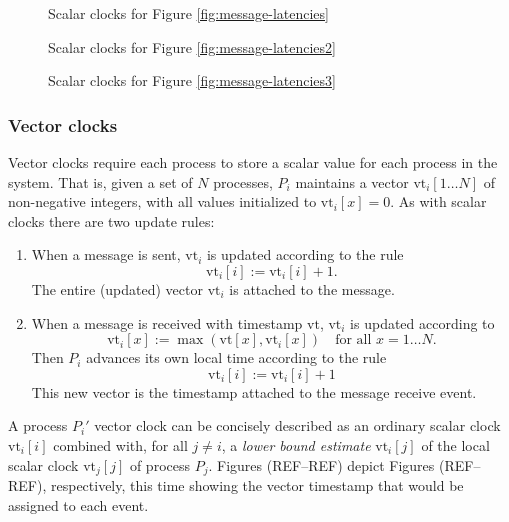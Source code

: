 \documentclass[]             %
{NASA}                       %
\theoremstyle{definition}
\begin{document}
{
 \setlength\belowcaptionskip{-3ex}
\begin{figure}[p]
  \centering 
  \caption{Scalar clocks for Figure \ref{fig:message-latencies}}
  \label{fig:message-latencies-scalar}
\end{figure}

\begin{figure}[p]
  \centering 
  \caption{Scalar clocks for Figure \ref{fig:message-latencies2}}
  \label{fig:message-latencies2-scalar}
\end{figure}

\begin{figure}[p]
  \centering 
  \caption{Scalar clocks for Figure \ref{fig:message-latencies3}}
  \label{fig:message-latencies3-scalar}
\end{figure}
\afterpage{\clearpage}
}

\subsubsection{Vector clocks}
\newcommand{\vt}{\textrm{vt}}
Vector clocks require each process to store a scalar value for each
process in the system. That is, given a set of $N$ processes, $P_i$
maintains a vector $\vt_i[1 \ldots N]$ of non-negative
integers, with all values initialized to $\vt_i[x] = 0$. As
with scalar clocks there are two update rules:

\begin{enumerate}
\item When a message is sent, $\vt_i$ is updated according to the rule
  \[\vt_i[i] := \vt_i[i] + 1.\]
  The entire (updated) vector $\vt_i$ is attached to the message.
\item When a message is received with timestamp $\vt$, $\vt_i$ is updated according to
  \[\vt_i[x] := \max(\vt[x], \vt_i[x]) \quad \textrm{for all $x = 1\ldots N$}.\]
  Then $P_i$ advances its own local time according to the rule
  \[ \vt_i[i] := \vt_i[i] + 1\]
  This new vector is the timestamp attached to the message receive event.
\end{enumerate}

A process $P_i'$ vector clock can be concisely described as an
ordinary scalar clock $\vt_i[i]$ combined with, for all $j \neq i$, a
\emph{lower bound estimate} $\vt_i[j]$ of the local scalar clock
$\vt_j[j]$ of process $P_j$. Figures (REF--REF) depict Figures
(REF--REF), respectively, this time showing the vector timestamp that
would be assigned to each event.
\end{document}
